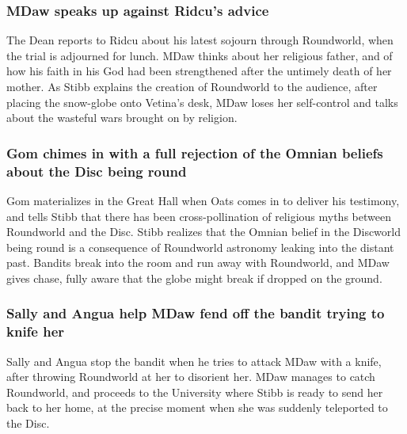 \subsubsection{\Gls{MDaw} speaks up against \Gls{Ridcu}'s advice}
The \Gls{Dean} reports to \Gls{Ridcu} about his latest sojourn through Roundworld, when the trial is
adjourned for lunch. \Gls{MDaw} thinks about her religious father, and of how his faith in his
God had been strengthened after the untimely death of her mother. As \Gls{Stibb} explains the
creation of Roundworld to the audience, after placing the snow-globe onto \Gls{Vetina}'s desk,
\Gls{MDaw} loses her self-control and talks about the wasteful wars brought on by religion.

\subsubsection{\Gls{Gom} chimes in with a full rejection of the Omnian beliefs about the Disc
    being round}
\Gls{Gom} materializes in the Great Hall when \Gls{Oats} comes in to deliver his testimony, and
tells \Gls{Stibb} that there has been cross-pollination of religious myths between Roundworld and
the Disc. \Gls{Stibb} realizes that the Omnian belief in the Discworld being round is a consequence
of Roundworld astronomy leaking into the distant past. Bandits break into the room and run away with
Roundworld, and \Gls{MDaw} gives chase, fully aware that the globe might break if dropped on the
ground.

\subsubsection{\Gls{Sally} and \Gls{Angua} help \Gls{MDaw} fend off the bandit trying to knife her}
\Gls{Sally} and \Gls{Angua} stop the bandit when he tries to attack \Gls{MDaw} with a knife, after
throwing Roundworld at her to disorient her. \Gls{MDaw} manages to catch Roundworld, and proceeds
to the University where \Gls{Stibb} is ready to send her back to her home, at the precise moment
when she was suddenly teleported to the Disc.